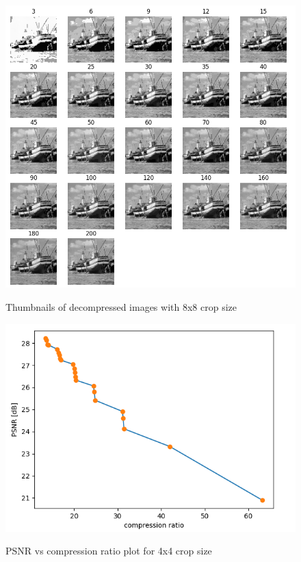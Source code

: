 \documentclass[../IDP_Task5_Karwowski_Kowalewski.tex]{subfiles}
\begin{document}
{    \begin{figure}[!htbp]
        \centering
        \includegraphics[width=\textwidth]{img/karwowski/8x8_images}
        \label{fig:8x8_images}
        \caption{Thumbnails of decompressed images with 8x8 crop size}
    \end{figure}

    \begin{figure}[!htbp]
        \centering
        \includegraphics[width=\textwidth]{img/karwowski/4x4_compression_ratio}
        \label{fig:4x4_compression_ratio}
        \caption{PSNR vs compression ratio plot for 4x4 crop size}
    \end{figure}
    
}
\end{document}
